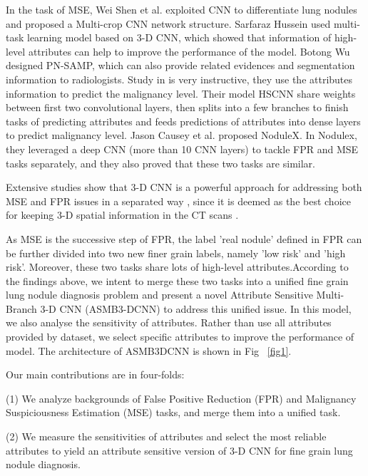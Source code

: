 \documentclass[runningheads]{llncs}
\begin{document}
In the task of MSE, Wei Shen et al. \cite{Shen2017Multi} exploited CNN to differentiate lung nodules and proposed a Multi-crop CNN network structure. Sarfaraz Hussein \cite{Hussein2017Risk} used multi-task learning model based on 3-D CNN, which showed that information of high-level attributes can help to improve the performance of the model. Botong Wu\cite{Wu2018Joint} designed PN-SAMP, which can also provide related evidences and segmentation information to radiologists.
Study in \cite{shen2019interpretable} is very instructive, they  use the attributes information to predict the malignancy level. Their model HSCNN share weights between first two convolutional layers, then splits into a few branches to finish tasks of predicting attributes and  feeds predictions of attributes into  dense layers to predict malignancy level.
Jason Causey et al.\cite{Causey2018Highly} proposed NoduleX. In Nodulex, they leveraged a deep CNN (more than 10 CNN layers) to tackle FPR and MSE tasks separately, and they also proved that these two tasks are similar.

Extensive studies show that 3-D CNN is a powerful approach for addressing both MSE and FPR issues in a separated way \cite{Qi2016Multilevel}\cite{Causey2018Highly}\cite{Shen2015Multi}\cite{Kang20173D}, since it is deemed as the best choice for keeping 3-D spatial information in the CT scans \cite{Yorozu1987Electron}.


 As MSE is the successive step of FPR, the label 'real nodule' defined in FPR can be further divided into two new finer grain labels, namely 'low risk' and 'high risk'. Moreover, these two tasks share lots of high-level attributes.According to the findings above, we intent to merge these two tasks into a unified fine grain lung nodule diagnosis problem and present a novel Attribute Sensitive Multi-Branch 3-D CNN (ASMB3-DCNN) to address this unified issue. In this model, we also analyse the sensitivity of attributes. Rather than use all attributes provided by dataset, we select specific attributes to improve the performance of model. 
The architecture of ASMB3DCNN is shown in Fig ~\ref{fig1}.


Our main contributions are in four-folds:

(1) We analyze backgrounds of False Positive Reduction (FPR) and  Malignancy Suspiciousness Estimation (MSE) tasks, and merge them into a unified task.

(2) We measure the sensitivities of attributes and select the most reliable attributes to yield an attribute sensitive version of 3-D CNN for fine grain lung nodule diagnosis.
\end{document}
